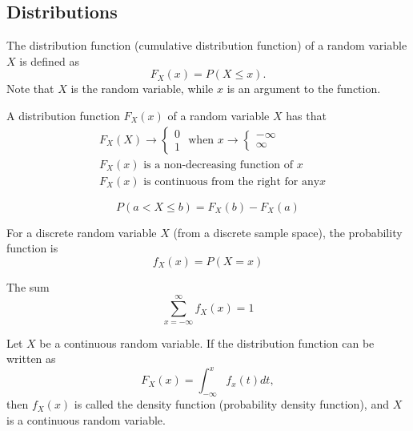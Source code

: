 \subsection{Distributions}
\begin{definition}
	The distribution function (cumulative distribution function) of a random variable \(X\) is defined as
	\[
		F_X(x) = P(X \leq x).
	\]
	Note that \(X\) is the random variable, while \(x\) is an argument to the function. 
\end{definition}

\begin{corollary}
	A distribution function \(F_X(x)\) of a random variable \(X\) has that
	\begin{align}
		&F_X(X) \rightarrow \begin{cases} 0 \\ 1 \end{cases} \text{ when } x \rightarrow \begin{cases} - \infty \\ \infty  \end{cases}  \\
		&F_X(x) \text{ is a non-decreasing function of } x \\
		&F_X(x) \text{ is continuous from the right for any} x
	\end{align}
\end{corollary}

\begin{theorem}
	\[
		P(a < X \leq b) = F_X(b) - F_X(a)
	\]
\end{theorem}


\begin{definition}
	For a discrete random variable \(X\) (from a discrete sample space), the probability function is
	\[
		f_X(x) = P(X = x)
	\]
\end{definition}

\begin{theorem}
	The sum
	\[
		\sum_{x = -\infty }^{\infty} f_X(x) = 1
	\]
\end{theorem}

\begin{definition}
	Let \(X\) be a continuous random variable. If the distribution function can be written as
	\[
		F_X(x) = \int_{- \infty } ^x f_x(t)dt,
	\]
	then \(f_X(x)\) is called the density function (probability density function), and \(X\) is a continuous random variable.
\end{definition}

